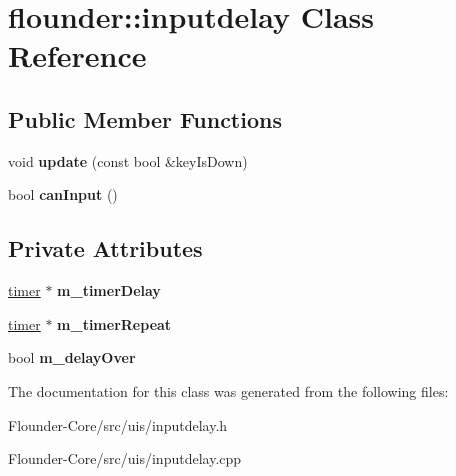 \hypertarget{classflounder_1_1inputdelay}{}\section{flounder\+:\+:inputdelay Class Reference}
\label{classflounder_1_1inputdelay}
\subsection*{Public Member Functions}
\begin{DoxyCompactItemize}
\item 
\mbox{\label{classflounder_1_1inputdelay_a28371a4f38cb5e70044aefccb3d7f651}} 
void {\bfseries update} (const bool \&key\+Is\+Down)
\item 
\mbox{\label{classflounder_1_1inputdelay_a9ed02cf3bc03fe84401cad6396223664}} 
bool {\bfseries can\+Input} ()
\end{DoxyCompactItemize}
\subsection*{Private Attributes}
\begin{DoxyCompactItemize}
\item 
\mbox{\label{classflounder_1_1inputdelay_af06b9bb38cd1c07ca4ac225c5895a21e}} 
\hyperlink{classflounder_1_1timer}{timer} $\ast$ {\bfseries m\+\_\+timer\+Delay}
\item 
\mbox{\label{classflounder_1_1inputdelay_a4c1e441caf57cf4cfd21488a9967c355}} 
\hyperlink{classflounder_1_1timer}{timer} $\ast$ {\bfseries m\+\_\+timer\+Repeat}
\item 
\mbox{\label{classflounder_1_1inputdelay_ab37bc0a1daea38b2814cada46bb8417a}} 
bool {\bfseries m\+\_\+delay\+Over}
\end{DoxyCompactItemize}


The documentation for this class was generated from the following files\+:\begin{DoxyCompactItemize}
\item 
Flounder-\/\+Core/src/uis/inputdelay.\+h\item 
Flounder-\/\+Core/src/uis/inputdelay.\+cpp\end{DoxyCompactItemize}
